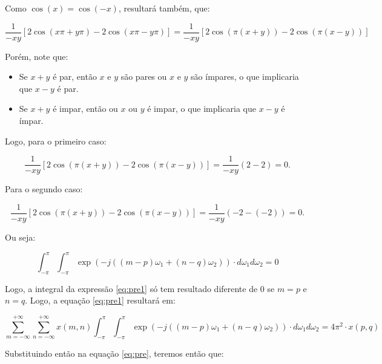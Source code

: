 \documentclass[]{abntex2}
\begin{document}
\begin{itemize}
	Como $\cos (x) = \cos (-x)$, resultará também, que:

	\begin{equation*}
		\dfrac{1}{-xy} [2\cos \left(x \pi + y \pi \right) - 2\cos \left(x \pi - y \pi \right)] = \dfrac{1}{-xy} [2\cos \left(\pi(x + y) \right) - 2\cos \left(\pi(x - y) \right)] 
	\end{equation*}

	Porém, note que:

	\begin{itemize}
		\item Se $x + y$ é par, então $x$ e $y$ são pares ou $x$ e $y$ são ímpares, o que implicaria que $x-y$ é par.
		\item Se $x + y$ é impar, então ou $x$ ou $y$ é impar, o que implicaria que $x-y$ é ímpar.
	\end{itemize}

	Logo, para o primeiro caso:

	\begin{equation*}
		\dfrac{1}{-xy} [2\cos \left(\pi(x + y) \right) - 2\cos \left(\pi(x - y) \right)] = \dfrac{1}{-xy} (2-2) = 0. 
	\end{equation*}

	Para o segundo caso:

	\begin{equation*}
		\dfrac{1}{-xy} [2\cos \left(\pi(x + y) \right) - 2\cos \left(\pi(x - y) \right)] = \dfrac{1}{-xy} (-2-(-2)) = 0. 
	\end{equation*}

	Ou seja:

	\begin{equation*}
		\int_{-\pi}^{\pi} \int_{-\pi}^{\pi}\exp \left( -j ((m-p) \omega_1 + (n-q) \omega_2) \right) \cdot d\omega_1 d\omega_2 = 0
	\end{equation*}

\end{itemize}

Logo, a integral da expressão \ref{eq:pre1} só tem resultado diferente de 0 se $m=p$ e $n=q$. Logo, a equação \ref{eq:pre1} resultará em:

\begin{equation*}
	\sum_{m=-\infty}^{+\infty} \sum_{n=-\infty}^{+\infty} x(m, n) \int_{-\pi}^{\pi} \int_{-\pi}^{\pi}\exp \left( -j ((m-p) \omega_1 + (n-q) \omega_2) \right) \cdot d\omega_1 d\omega_2 = 4\pi^{2}\cdot x(p,q)
\end{equation*}

Substituindo então na equação \ref{eq:pre}, teremos então que:
\end{document}
